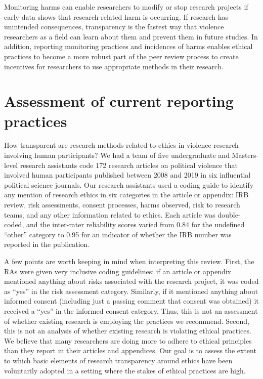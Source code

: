 Monitoring harms can enable researchers to modify or stop research projects if early data shows that research-related harm is occurring. If research has unintended consequences, transparency is the fastest way that violence researchers as a field can learn about them and prevent them in future studies. In addition, reporting monitoring practices and incidences of harms enables ethical practices to become a more robust part of the peer review process to create incentives for researchers to use appropriate methods in their research.

\section{Assessment of current reporting practices}\label{sec:meta}

How transparent are research methods related to ethics in violence research involving human participants? We had a team of five undergraduate and Masters-level research assistants code 172 research articles on political violence that involved human participants published between 2008 and 2019 in six influential political science journals. Our research assistants used a coding guide to identify any mention of research ethics in six categories in the article or appendix: IRB review, risk assessments, consent processes, harms observed, risk to research teams, and any other information related to ethics. Each article was double-coded, and the inter-rater reliability scores varied from 0.84 for the undefined ``other'' category to 0.95 for an indicator of whether the IRB number was reported in the publication.

A few points are worth keeping in mind when interpreting this review. First, the RAs were given very inclusive coding guidelines: if an article or appendix mentioned anything about risks associated with the research project, it was coded as ``yes'' in the risk assessment category. Similarly, if it mentioned anything about informed consent (including just a passing comment that consent was obtained) it received a ``yes'' in the informed consent category. Thus, this is not an assessment of whether existing research is employing the practices we recommend. Second, this is not an analysis of whether existing research is violating ethical practices. We believe that many researchers are doing more to adhere to ethical principles than they report in their articles and appendices. Our goal is to assess the extent to which basic elements of research transparency around ethics have been voluntarily adopted in a setting where the stakes of ethical practices are high. 

